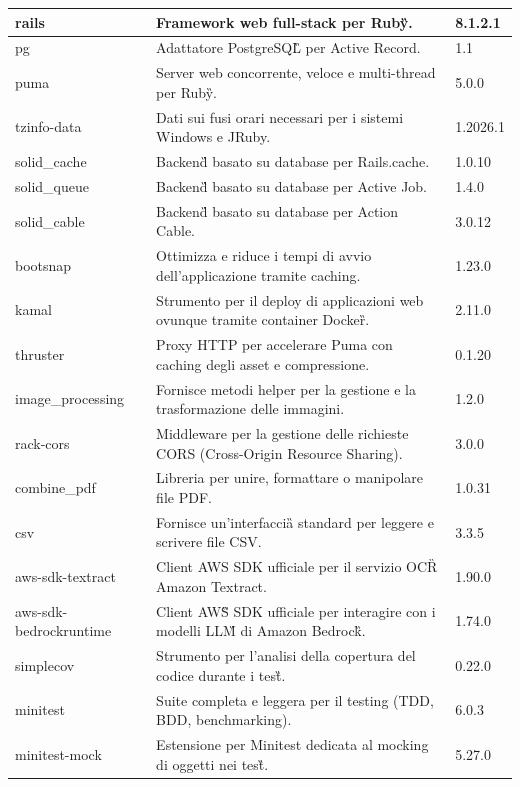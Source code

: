 \documentclass[a4paper,11pt]{article}
\begin{document}
\begin{longtable}{|p{3.5cm}|p{8.5cm}|p{3cm}|}
rails & Framework web full-stack per Ruby\G{}. & 8.1.2.1 \\
\hline
pg & Adattatore PostgreSQL\G{} per Active Record. & 1.1 \\
\hline
puma & Server web concorrente, veloce e multi-thread per Ruby\G{}. & 5.0.0 \\
\hline
tzinfo-data & Dati sui fusi orari necessari per i sistemi Windows e JRuby. & 1.2026.1 \\
\hline
solid\_cache & Backend\G{} basato su database per Rails.cache. & 1.0.10 \\
\hline
solid\_queue & Backend\G{} basato su database per Active Job. & 1.4.0 \\
\hline
solid\_cable & Backend\G{} basato su database per Action Cable. & 3.0.12 \\
\hline
bootsnap & Ottimizza e riduce i tempi di avvio dell'applicazione tramite caching. & 1.23.0 \\
\hline
kamal & Strumento per il deploy di applicazioni web ovunque tramite container Docker\G{}. & 2.11.0 \\
\hline
thruster & Proxy HTTP per accelerare Puma con caching degli asset e compressione. & 0.1.20 \\
\hline
image\_processing & Fornisce metodi helper per la gestione e la trasformazione delle immagini. & 1.2.0 \\
\hline
rack-cors & Middleware per la gestione delle richieste CORS (Cross-Origin Resource Sharing). & 3.0.0 \\
\hline
combine\_pdf & Libreria per unire, formattare o manipolare file PDF. & 1.0.31 \\
\hline
csv & Fornisce un'interfaccia\G{} standard per leggere e scrivere file CSV. & 3.3.5 \\
\hline
aws-sdk-textract & Client AWS SDK ufficiale per il servizio OCR\G{} Amazon Textract. & 1.90.0 \\
\hline
aws-sdk-bedrockruntime & Client AWS\G{} SDK ufficiale per interagire con i modelli LLM\G{} di Amazon Bedrock\G{}. & 1.74.0 \\
\hline
simplecov & Strumento per l'analisi della copertura del codice durante i test\G{}. & 0.22.0 \\
\hline
minitest & Suite completa e leggera per il testing (TDD, BDD, benchmarking). & 6.0.3 \\
\hline
minitest-mock & Estensione per Minitest dedicata al mocking di oggetti nei test\G{}. & 5.27.0 \\

\end{longtable}
\end{document}
